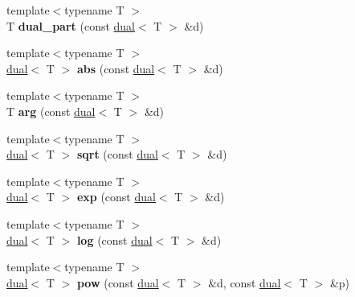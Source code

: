 \begin{DoxyCompactItemize}
\item 
\hypertarget{namespace_d_r_d_s_p_a3c9e977644af809869f112e367caadb9}{{\footnotesize template$<$typename T $>$ }\\T {\bfseries dual\-\_\-part} (const \hyperlink{struct_d_r_d_s_p_1_1dual}{dual}$<$ T $>$ \&d)}\label{namespace_d_r_d_s_p_a3c9e977644af809869f112e367caadb9}

\item 
\hypertarget{namespace_d_r_d_s_p_a129a80d5db6fc98a0052597e156abaff}{{\footnotesize template$<$typename T $>$ }\\\hyperlink{struct_d_r_d_s_p_1_1dual}{dual}$<$ T $>$ {\bfseries abs} (const \hyperlink{struct_d_r_d_s_p_1_1dual}{dual}$<$ T $>$ \&d)}\label{namespace_d_r_d_s_p_a129a80d5db6fc98a0052597e156abaff}

\item 
\hypertarget{namespace_d_r_d_s_p_a15969842b2014288e34f312be339f5ee}{{\footnotesize template$<$typename T $>$ }\\T {\bfseries arg} (const \hyperlink{struct_d_r_d_s_p_1_1dual}{dual}$<$ T $>$ \&d)}\label{namespace_d_r_d_s_p_a15969842b2014288e34f312be339f5ee}

\item 
\hypertarget{namespace_d_r_d_s_p_a5223ce10411e0547739bb603a3a4b5fa}{{\footnotesize template$<$typename T $>$ }\\\hyperlink{struct_d_r_d_s_p_1_1dual}{dual}$<$ T $>$ {\bfseries sqrt} (const \hyperlink{struct_d_r_d_s_p_1_1dual}{dual}$<$ T $>$ \&d)}\label{namespace_d_r_d_s_p_a5223ce10411e0547739bb603a3a4b5fa}

\item 
\hypertarget{namespace_d_r_d_s_p_a0c6fce852ec748b5dde1e2026a5396f1}{{\footnotesize template$<$typename T $>$ }\\\hyperlink{struct_d_r_d_s_p_1_1dual}{dual}$<$ T $>$ {\bfseries exp} (const \hyperlink{struct_d_r_d_s_p_1_1dual}{dual}$<$ T $>$ \&d)}\label{namespace_d_r_d_s_p_a0c6fce852ec748b5dde1e2026a5396f1}

\item 
\hypertarget{namespace_d_r_d_s_p_a6039dc69feffbf6e0dea9430d8e05d33}{{\footnotesize template$<$typename T $>$ }\\\hyperlink{struct_d_r_d_s_p_1_1dual}{dual}$<$ T $>$ {\bfseries log} (const \hyperlink{struct_d_r_d_s_p_1_1dual}{dual}$<$ T $>$ \&d)}\label{namespace_d_r_d_s_p_a6039dc69feffbf6e0dea9430d8e05d33}

\item 
\hypertarget{namespace_d_r_d_s_p_ac4ae849223e1446bfbeb3b0da0c0ab2c}{{\footnotesize template$<$typename T $>$ }\\\hyperlink{struct_d_r_d_s_p_1_1dual}{dual}$<$ T $>$ {\bfseries pow} (const \hyperlink{struct_d_r_d_s_p_1_1dual}{dual}$<$ T $>$ \&d, const \hyperlink{struct_d_r_d_s_p_1_1dual}{dual}$<$ T $>$ \&p)}\label{namespace_d_r_d_s_p_ac4ae849223e1446bfbeb3b0da0c0ab2c}


\end{DoxyCompactItemize}

